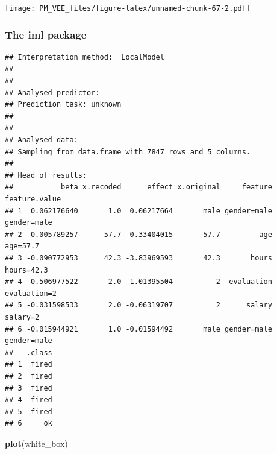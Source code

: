 \documentclass[12pt,]{krantz}
\newenvironment{Shaded}{\begin{snugshade}}{\end{snugshade}}
\newcommand{\DataTypeTok}[1]{\textcolor[rgb]{0.13,0.29,0.53}{#1}}
\newcommand{\DecValTok}[1]{\textcolor[rgb]{0.00,0.00,0.81}{#1}}
\newcommand{\KeywordTok}[1]{\textcolor[rgb]{0.13,0.29,0.53}{\textbf{#1}}}
\newcommand{\NormalTok}[1]{#1}
\newcommand{\OperatorTok}[1]{\textcolor[rgb]{0.81,0.36,0.00}{\textbf{#1}}}
\newcommand{\StringTok}[1]{\textcolor[rgb]{0.31,0.60,0.02}{#1}}
\theoremstyle{definition}
\theoremstyle{definition}
\theoremstyle{definition}
\theoremstyle{remark}
\begin{document}
\texttt{[image: PM\_VEE\_files/figure-latex/unnamed-chunk-67-2.pdf]}

\hypertarget{the-iml-package}{%
\subsubsection{\texorpdfstring{\textbf{The iml
package}}{The iml package}}\label{the-iml-package}}

\begin{Shaded}
\end{Shaded}

\begin{verbatim}
## Interpretation method:  LocalModel 
## 
## 
## Analysed predictor: 
## Prediction task: unknown 
## 
## 
## Analysed data:
## Sampling from data.frame with 7847 rows and 5 columns.
## 
## Head of results:
##           beta x.recoded      effect x.original     feature feature.value
## 1  0.062176640       1.0  0.06217664       male gender=male   gender=male
## 2  0.005789257      57.7  0.33404015       57.7         age      age=57.7
## 3 -0.090772953      42.3 -3.83969593       42.3       hours    hours=42.3
## 4 -0.506977522       2.0 -1.01395504          2  evaluation  evaluation=2
## 5 -0.031598533       2.0 -0.06319707          2      salary      salary=2
## 6 -0.015944921       1.0 -0.01594492       male gender=male   gender=male
##   .class
## 1  fired
## 2  fired
## 3  fired
## 4  fired
## 5  fired
## 6     ok
\end{verbatim}

\begin{Shaded}
\begin{Highlighting}[]
\KeywordTok{plot}\NormalTok{(white_box)}
\end{Highlighting}
\end{Shaded}
\end{document}
